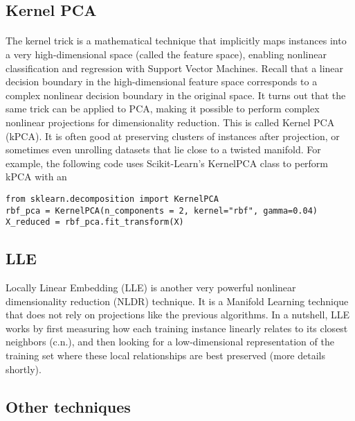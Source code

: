 \documentclass[%
oneside,                 %
final,                   %
10pt]{article}
\begin{document}
\subsection*{Kernel PCA}

\paragraph{}

The kernel trick is a mathematical technique that implicitly maps instances into a
very high-dimensional space (called the feature space), enabling nonlinear classification and regression
with Support Vector Machines. Recall that a linear decision boundary in the high-dimensional feature
space corresponds to a complex nonlinear decision boundary in the original space.
It turns out that the same trick can be applied to PCA, making it possible to perform complex nonlinear
projections for dimensionality reduction. This is called Kernel PCA (kPCA). It is often good at
preserving clusters of instances after projection, or sometimes even unrolling datasets that lie close to a
twisted manifold.
For example, the following code uses Scikit-Learn’s KernelPCA class to perform kPCA with an
\begin{verbatim}
from sklearn.decomposition import KernelPCA
rbf_pca = KernelPCA(n_components = 2, kernel="rbf", gamma=0.04)
X_reduced = rbf_pca.fit_transform(X)
\end{verbatim}

 


\subsection*{LLE}

Locally Linear Embedding (LLE) is another very powerful nonlinear dimensionality reduction
(NLDR) technique. It is a Manifold Learning technique that does not rely on projections like the previous
algorithms. In a nutshell, LLE works by first measuring how each training instance linearly relates to its
closest neighbors (c.n.), and then looking for a low-dimensional representation of the training set where
these local relationships are best preserved (more details shortly). 



\subsection*{Other techniques}
\end{document}
